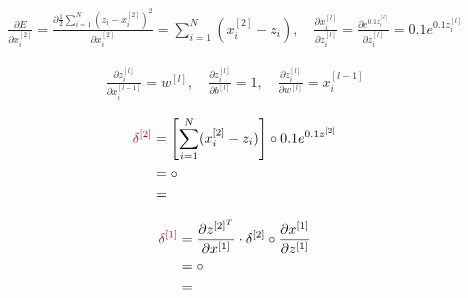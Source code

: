 \documentclass[12pt]{article}
\begin{document}
\begin{enumerate}[leftmargin=\labelsep]

        \begin{equation*}
          \begin{aligned}
            \frac{\partial E}{\partial x_i^{[2]}} = \frac{\partial \frac{1}{2}\sum_{i=1}^N (z_i - x_i^{[2]})^2}{\partial x_i^{[2]}} = \sum_{i=1}^N (x_i^{[2]} - z_i), \quad
            \frac{\partial x_i^{[l]}}{\partial z_i^{[l]}} = \frac{\partial e^{0.1z_i^{[l]}}}{\partial z_i^{[l]}} = 0.1e^{0.1z_i^{[l]}}
          \end{aligned}
        \end{equation*}

        \begin{equation*}
          \begin{aligned}
            \frac{\partial z_i^{[l]}}{\partial x_i^{[l - 1]}} = w^{[l]}, \quad
            \frac{\partial z_i^{[l]}}{\partial b^{[l]}} = 1, \quad
            \frac{\partial z_i^{[l]}}{\partial w^{[l]}} = x_i^{[l - 1]}
          \end{aligned}
        \end{equation*}

        \begin{equation*}
          \begin{aligned}
            \textcolor{purple}{\delta^{[2]}} & = \left[\sum_{i=1}^N(x_i^{[2]} - z_i)\right] \circ 0.1e^{0.1z^{[2]}}            \\
                                             & =  \circ  \\
                                             & = 
          \end{aligned}
        \end{equation*}

        \begin{equation*}
          \begin{aligned}
            \textcolor{purple}{\delta^{[1]}} & = \frac{\partial z^{[2]^T}}{\partial x^{[1]}} \cdot \delta^{[2]} \circ \frac{\partial x^{[1]}}{\partial z^{[1]}} \\
                                             & =  \circ                            \\
                                             & = 
          \end{aligned}
        \end{equation*}


\end{enumerate}
\end{document}
